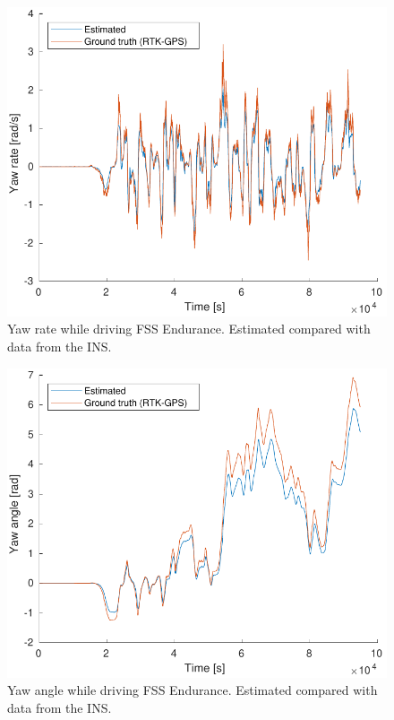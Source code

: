 \begin{figure}
    \centering
    \includegraphics[width=0.8\linewidth]{0_Images/6_Results/rFSSEndurance.pdf}
    \caption[Yaw rate while driving FSS Endurance.]
    {Yaw rate  while driving FSS Endurance. Estimated compared with data from the INS.}
    \label{Fig:RFSSEndurance}
\end{figure}

\begin{figure}
    \centering
    \includegraphics[width=0.8\linewidth]{0_Images/6_Results/yawFSSEndurance.pdf}
    \caption[Yaw angle while driving FSS Endurance.]
    {Yaw angle while driving FSS Endurance. Estimated compared with data from the INS.}
    \label{Fig:YawFSSEndurance}
\end{figure}

